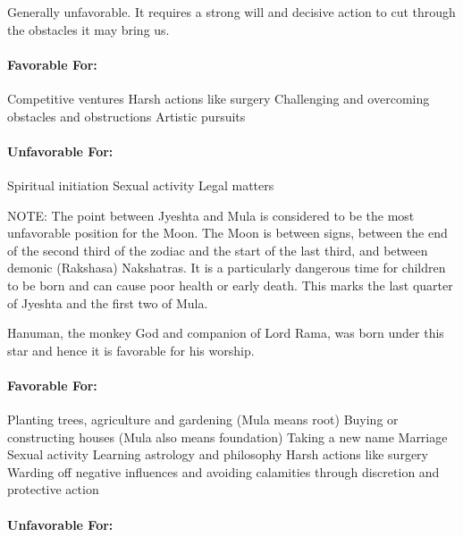 
Generally unfavorable. It requires a strong will and decisive action to cut through the obstacles it may bring us.

 

\paragraph{Favorable For:}

Competitive ventures
Harsh actions like surgery
Challenging and overcoming obstacles and obstructions
Artistic pursuits
 

\paragraph{Unfavorable For:}

Spiritual initiation
Sexual activity
Legal matters
 

NOTE: The point between Jyeshta and Mula is considered to be the most unfavorable position for the Moon. The Moon is between signs, between the end of the second third of the zodiac and the start of the last third, and between demonic (Rakshasa) Nakshatras. It is a particularly dangerous time for children to be born and can cause poor health or early death. This marks the last quarter of Jyeshta and the first two of Mula.

 


Hanuman, the monkey God and companion of Lord Rama, was born under this star and hence it is favorable for his worship.

 

\paragraph{Favorable For:}

Planting trees, agriculture and gardening (Mula means root)
Buying or constructing houses (Mula also means foundation)
Taking a new name
Marriage
Sexual activity
Learning astrology and philosophy
Harsh actions like surgery
Warding off negative influences and avoiding calamities through discretion and protective action
 

\paragraph{Unfavorable For:}

